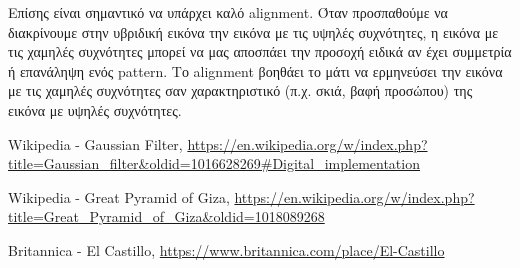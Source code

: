 \documentclass[11pt]{scrartcl} %
\begin{document}
Επίσης είναι σημαντικό να υπάρχει καλό alignment.
Όταν προσπαθούμε να διακρίνουμε στην υβριδική εικόνα την εικόνα με τις υψηλές συχνότητες, η εικόνα με τις χαμηλές συχνότητες μπορεί να μας αποσπάει την προσοχή ειδικά αν έχει συμμετρία ή επανάληψη ενός pattern.
Το alignment βοηθάει το μάτι να ερμηνεύσει την εικόνα με τις χαμηλές συχνότητες σαν χαρακτηριστικό (π.χ. σκιά, βαφή προσώπου) της εικόνα με υψηλές συχνότητες.


\begin{thebibliography}{3}

Wikipedia - Gaussian Filter,
\url{https://en.wikipedia.org/w/index.php?title=Gaussian_filter&oldid=1016628269#Digital_implementation}

Wikipedia - Great Pyramid of Giza,
\url{https://en.wikipedia.org/w/index.php?title=Great_Pyramid_of_Giza&oldid=1018089268}

Britannica - El Castillo,
\url{https://www.britannica.com/place/El-Castillo}

\end{thebibliography}
\end{document}
